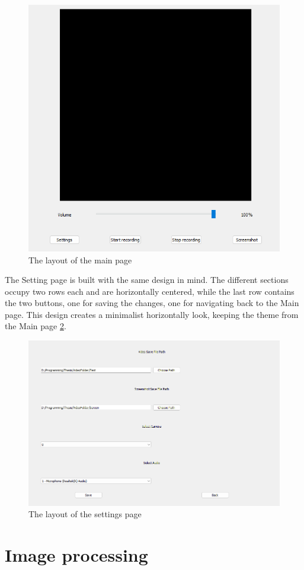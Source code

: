 \begin{figure}
    \centering
    \includegraphics[width=0.5\linewidth]{figures/MainPage.png}
    \caption{The layout of the main page}
    \label{fig:MainPage}
\end{figure}

\par The Setting page is built with the same design in mind. The different sections occupy two rows each and are horizontally centered, while the last row contains the two buttons, one for saving the changes, one for navigating back to the Main page. This design creates a minimalist horizontally look, keeping the theme from the Main page \ref{fig:SettingsPage}.

\begin{figure}
    \centering
    \includegraphics[width=0.8\linewidth]{figures/SettingsPage.png}
    \caption{The layout of the settings page}
    \label{fig:SettingsPage}
\end{figure}

\section{Image processing}
\label{sec:designsec3}

